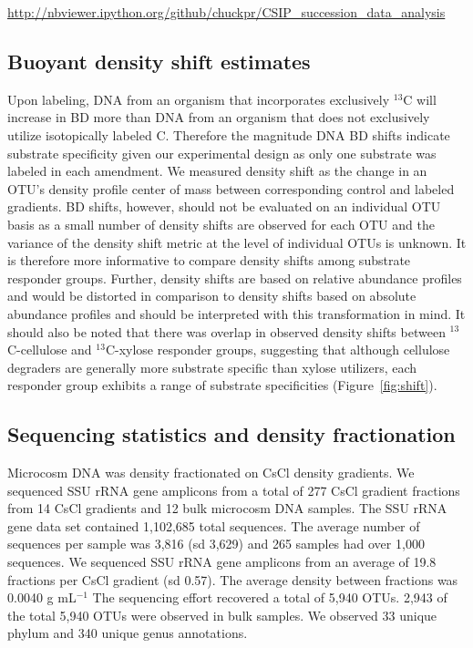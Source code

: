 \documentclass{article}
\begin{document}
\url{http://nbviewer.ipython.org/github/chuckpr/CSIP_succession_data_analysis}

\subsection{Buoyant density shift estimates}\label{BD}
Upon labeling, DNA from an organism that incorporates exclusively $^{13}$C will
increase in BD more than DNA from an organism that does not exclusively utilize
isotopically labeled C. Therefore the magnitude DNA BD shifts indicate
substrate specificity given our experimental design as only one substrate was
labeled in each amendment. We measured density shift as the change in an OTU's
density profile center of mass between corresponding control and labeled
gradients. BD shifts, however, should not be evaluated on an individual OTU
basis as a small number of density shifts are observed for each OTU and the
variance of the density shift metric at the level of individual OTUs is
unknown. It is therefore more informative to compare density shifts among
substrate responder groups. Further, density shifts are based on relative
abundance profiles and would be distorted in comparison to density shifts based
on absolute abundance profiles and should be interpreted with this
transformation in mind. It should also be noted that there was overlap in
observed density shifts between $^{13}$C-cellulose and $^{13}$C-xylose
responder groups, suggesting that although cellulose degraders are generally
more substrate specific than xylose utilizers, each responder group
exhibits a range of substrate specificities (Figure~\ref{fig:shift}). 

\subsection{Sequencing statistics and density fractionation}\label{seq_stats}
Microcosm DNA was density fractionated on CsCl density gradients. We sequenced
SSU rRNA gene amplicons from a total of 277 CsCl gradient fractions from 14
CsCl gradients and 12 bulk microcosm DNA samples. The SSU rRNA gene data set
contained 1,102,685 total sequences. The average number of sequences per sample
was 3,816 (sd 3,629) and 265 samples had over 1,000 sequences. We sequenced SSU
rRNA gene amplicons from an average of
19.8 fractions per CsCl gradient (sd 0.57). The average density between
fractions was  0.0040 g mL$^{-1}$ The sequencing effort recovered a total of
5,940 OTUs. 2,943 of the total 5,940 OTUs were observed in bulk samples. We
observed 33 unique phylum and 340 unique genus annotations.
\end{document}
